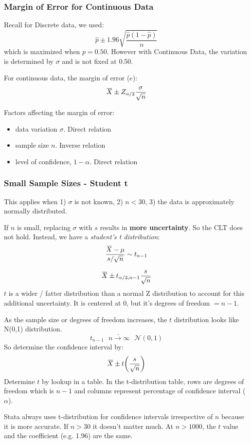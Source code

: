 \documentclass[11pt, oneside]{article}   	%
\newcommand{\overbar}[1]{\mkern 1.5mu\overline{\mkern-1.5mu#1\mkern-1.5mu}\mkern 1.5mu}
\begin{document}
\subsubsection{Margin of Error for Continuous Data}
Recall for Discrete data, we used:
\[
\hat{p} \pm 1.96 \sqrt{ \frac{\hat{p}(1-\hat{p})} {n} }
\]
which is maximized when $p = 0.50$. However with Continuous Data, the variation is determined by $\sigma$ and is not fixed at 0.50.

For continuous data, the margin of error ($e$):
\[
\overbar{X} \pm Z_{\alpha / 2} \frac{\sigma} {\sqrt{n}}
\]

Factors affecting the margin of error:
\begin{itemize}
\item{data variation $\sigma$. Direct relation}
\item{sample size $n$. Inverse relation}
\item{level of confidence, $1-\alpha$. Direct relation}
\end{itemize}

\subsubsection{Small Sample Sizes - Student t}

This applies when 1) $\sigma$ is not known, 2) $n < 30$, 3) the data is approximately normally distributed.

If $n$ is small, replacing $\sigma$ with $s$ results in \textbf{more uncertainty}. So the CLT does not hold. Instead, we have a \textit{student's t distribution}:
\[
\frac{\overbar{X} - \mu} {s / \sqrt{n}} \sim t_{n-1}
\]

\[
\overbar{X} \pm t_{\alpha / 2, n-1} \frac{s} {\sqrt{n}}
\]
$t$ is a wider / fatter distribution than a normal Z distribution to account for this additional uncertainty. It is centered at 0, but it's degrees of freedom $= n-1$. 

As the sample size or degrees of freedom increases, the $t$ distribution looks like N(0,1) distribution.
\[
t_{n-1} \ \ \ \underrightarrow{n \rightarrow \infty} \ \ \ \mathcal{N}(0,1)
\]
So determine the confidence interval by:
\[
\overbar{X} \pm t \bigg(\frac{s}{\sqrt{n}}\bigg)
\]
Determine $t$ by lookup in a table. In the t-distribution table, rows are degrees of freedom which is $n-1$ and columns represent percentage of confidence interval ($\alpha$). 

Stata always uses t-distribution for confidence intervals irrespective of $n$ because it is more accurate. If $n > 30$ it doesn't matter much. At $n > 1000$, the $t$ value and the coefficient (e.g. 1.96) are the same.
\end{document}
